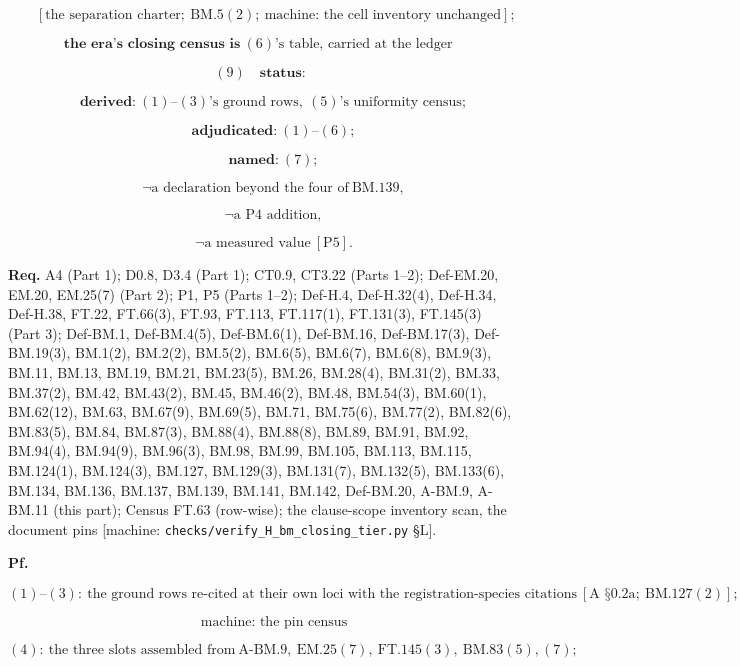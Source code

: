 \documentclass[11pt,openany]{report}
\theoremstyle{canonplain}
\theoremstyle{canondef}
\begin{document}
\[
\qquad [\text{the separation charter};\ \mathrm{BM.5}(2);\ \text{machine: the cell inventory unchanged}];
\]

\[
\textbf{the era's closing census is}\ (6)\text{'s table, carried at the ledger}\;
\]

\[
(9)\quad\textbf{status:}
\]

\[
\qquad \textbf{derived:}\ (1)\text{--}(3)\text{'s ground rows},\ (5)\text{'s uniformity census};
\]

\[
\qquad \textbf{adjudicated:}\ (1)\text{--}(6);
\]

\[
\qquad \textbf{named:}\ (7);
\]

\[
\qquad \neg\text{a declaration beyond the four of}\ \mathrm{BM.139},
\]

\[
\qquad \neg\text{a P4 addition},
\]

\[
\qquad \neg\text{a measured value}\ [\mathrm{P5}].
\]

\textbf{Req.} A4 (Part 1); D0.8, D3.4 (Part 1); CT0.9, CT3.22 (Parts 1–2); Def-EM.20, EM.20, EM.25(7) (Part 2); P1, P5 (Parts 1–2); Def-H.4, Def-H.32(4), Def-H.34, Def-H.38, FT.22, FT.66(3), FT.93, FT.113, FT.117(1), FT.131(3), FT.145(3) (Part 3); Def-BM.1, Def-BM.4(5), Def-BM.6(1), Def-BM.16, Def-BM.17(3), Def-BM.19(3), BM.1(2), BM.2(2), BM.5(2), BM.6(5), BM.6(7), BM.6(8), BM.9(3), BM.11, BM.13, BM.19, BM.21, BM.23(5), BM.26, BM.28(4), BM.31(2), BM.33, BM.37(2), BM.42, BM.43(2), BM.45, BM.46(2), BM.48, BM.54(3), BM.60(1), BM.62(12), BM.63, BM.67(9), BM.69(5), BM.71, BM.75(6), BM.77(2), BM.82(6), BM.83(5), BM.84, BM.87(3), BM.88(4), BM.88(8), BM.89, BM.91, BM.92, BM.94(4), BM.94(9), BM.96(3), BM.98, BM.99, BM.105, BM.113, BM.115, BM.124(1), BM.124(3), BM.127, BM.129(3), BM.131(7), BM.132(5), BM.133(6), BM.134, BM.136, BM.137, BM.139, BM.141, BM.142, Def-BM.20, A-BM.9, A-BM.11 (this part); Census FT.63 (row-wise); the clause-scope inventory scan, the document pins [machine: \texttt{checks/\allowbreak{}verify\_\allowbreak{}H\_\allowbreak{}bm\_\allowbreak{}closing\_\allowbreak{}tier.py} §L].

\textbf{Pf.}

\[
(1)\text{--}(3):\ \text{the ground rows re-cited at their own loci with the registration-species citations}\ [\text{A §0.2a};\ \mathrm{BM.127}(2)];
\]

\[
\qquad \text{machine: the pin census}
\]

\[
(4):\ \text{the three slots assembled from}\ \mathrm{A\text{-}BM.9},\ \mathrm{EM.25}(7),\ \mathrm{FT.145}(3),\ \mathrm{BM.83}(5),(7);
\]
\end{document}
